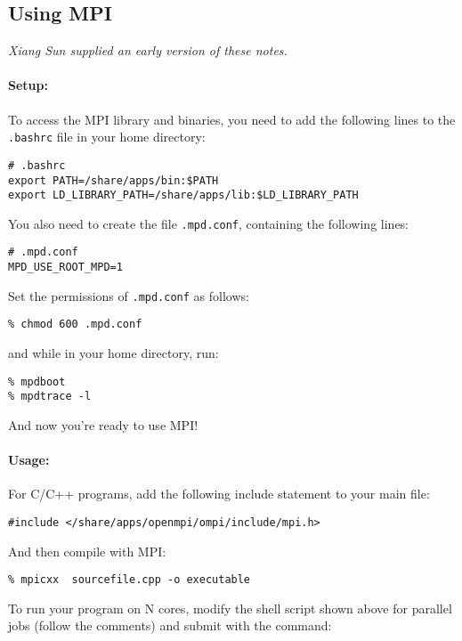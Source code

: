 \documentclass[letterpaper,12pt]{article}
\begin{document}
\subsection{Using MPI}
\emph{Xiang Sun supplied an early version of these notes.}

\paragraph{Setup:}
To access the MPI library and binaries, you need to add the following lines to the \texttt{.bashrc} file in your home directory:

\begin{verbatim}
# .bashrc
export PATH=/share/apps/bin:$PATH
export LD_LIBRARY_PATH=/share/apps/lib:$LD_LIBRARY_PATH
\end{verbatim}
You also need to create the file \texttt{.mpd.conf}, containing the following lines:

\begin{verbatim}
# .mpd.conf
MPD_USE_ROOT_MPD=1
\end{verbatim}
Set the permissions of \texttt{.mpd.conf} as follows:

\begin{verbatim}
% chmod 600 .mpd.conf
\end{verbatim}
and while in your home directory, run:

\begin{verbatim}
% mpdboot
% mpdtrace -l
\end{verbatim}
And now you're ready to use MPI!

\newpage

\paragraph{Usage:}
For C/C++ programs, add the following include statement to your main file:

\begin{verbatim}
#include </share/apps/openmpi/ompi/include/mpi.h>
\end{verbatim}
And then compile with MPI:

\begin{verbatim}
% mpicxx  sourcefile.cpp -o executable
\end{verbatim}
To run your program on N cores, modify the shell script shown above for parallel jobs (follow the comments) and submit with the command:
\end{document}
